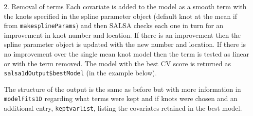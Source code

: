 \begin{block}{2. Removal of terms}
\noindent Each covariate is added to the model as a smooth term with the knots specified in the spline parameter object (default knot at the mean if from {\tt makesplineParams}) and then SALSA checks each one in turn for an improvement in knot number and location.  If there is an improvement then the spline parameter object is updated with the new number and location. If there is no improvement over the single mean knot model then the term is tested as linear or with the term removed.  The model with the best CV score is returned as {\tt salsa1dOutput\$bestModel} (in the example below).

\begin{knitrout}\footnotesize
{}\color{fgcolor}
\end{knitrout}

\noindent The structure of the output is the same as before but with more information in {\tt modelFits1D} regarding what terms were kept and if knots were chosen and an additional entry, {\tt keptvarlist}, listing the covariates retained in the best model.


\end{block}
